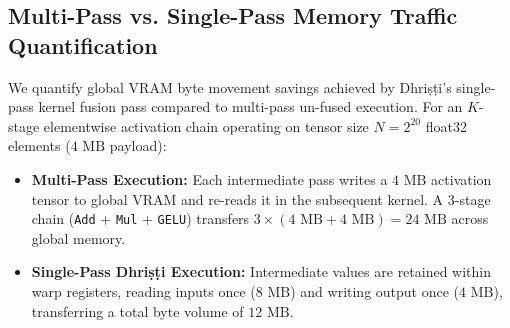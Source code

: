 \documentclass[10pt,journal,compsoc]{IEEEtran}
\begin{document}
\begin{table}[htbp]
\centering
\caption{Ablation Analysis of Dhri\d{s}\d{t}i Components Measured on NVIDIA Tesla T4 GPU (Latency in ms, Bandwidth in GB/s).}
\label{tab:ablation}
\end{table}

\subsection{Multi-Pass vs. Single-Pass Memory Traffic Quantification}
We quantify global VRAM byte movement savings achieved by Dhri\d{s}\d{t}i's single-pass kernel fusion pass compared to multi-pass un-fused execution. For an $K$-stage elementwise activation chain operating on tensor size $N = 2^{20}$ float32 elements ($4\text{ MB}$ payload):
\begin{itemize}
    \item \textbf{Multi-Pass Execution:} Each intermediate pass writes a $4\text{ MB}$ activation tensor to global VRAM and re-reads it in the subsequent kernel. A 3-stage chain (\texttt{Add} + \texttt{Mul} + \texttt{GELU}) transfers $3 \times (4\text{ MB} + 4\text{ MB}) = 24\text{ MB}$ across global memory.
    \item \textbf{Single-Pass Dhri\d{s}\d{t}i Execution:} Intermediate values are retained within warp registers, reading inputs once ($8\text{ MB}$) and writing output once ($4\text{ MB}$), transferring a total byte volume of $12\text{ MB}$.
\end{itemize}
\end{document}
